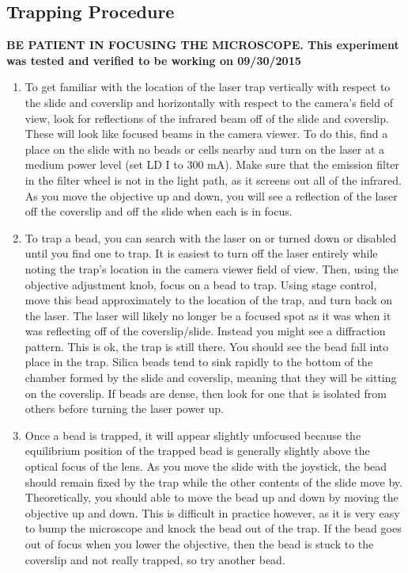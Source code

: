 \documentclass{../lab}
\begin{document}
\subsection{Trapping Procedure}

\textbf{BE PATIENT IN FOCUSING THE MICROSCOPE. This experiment was tested and verified to be working on 09/30/2015}

\begin{enumerate}
    \item To get familiar with the location of the laser trap vertically with respect to the slide and coverslip and horizontally with respect to the camera's field of view, look for reflections of the infrared beam off of the slide and coverslip. These will look like focused beams in the camera viewer. To do this, find a place on the slide with no beads or cells nearby and turn on the laser at a medium power level (set LD I to 300 mA). Make sure that the emission filter in the filter wheel is not in the light path, as it screens out all of the infrared. As you move the objective up and down, you will see a reflection of the laser off the coverslip and off the slide when each is in focus.
    
    \newpage

    \item To trap a bead, you can search with the laser on or turned down or disabled until you find one to trap. It is easiest to turn off the laser entirely while noting the trap's location in the camera viewer field of view. Then, using the objective adjustment knob, focus on a bead to trap. Using stage control, move this bead approximately to the location of the trap, and turn back on the laser. The laser will likely no longer be a focused spot as it was when it was reflecting off of the coverslip/slide. Instead you might see a diffraction pattern. This is ok, the trap is still there. You should see the bead fall into place in the trap. Silica beads tend to sink rapidly to the bottom of the chamber formed by the slide and coverslip, meaning that they will be sitting on the coverslip. If beads are dense, then look for one that is isolated from others before turning the laser power up.

    \item Once a bead is trapped, it will appear slightly unfocused because the equilibrium position of the trapped bead is generally slightly above the optical focus of the lens. As you move the slide with the joystick, the bead should remain fixed by the trap while the other contents of the slide move by. Theoretically, you should able to move the bead up and down by moving the objective up and down. This is difficult in practice however, as it is very easy to bump the microscope and knock the bead out of the trap. If the bead goes out of focus when you lower the objective, then the bead is stuck to the coverslip and not really trapped, so try another bead.


\end{enumerate}
\end{document}
